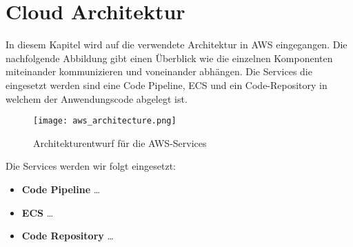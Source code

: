 \section{Cloud Architektur}
In diesem Kapitel wird auf die verwendete Architektur in \ac{AWS} eingegangen. Die nachfolgende Abbildung gibt einen Überblick wie die einzelnen Komponenten miteinander kommunizieren und voneinander abhängen. Die Services die eingesetzt werden sind eine Code Pipeline, ECS und ein Code-Repository in welchem der Anwendungscode abgelegt ist.

\begin{figure}[H]
    \centering
    \texttt{[image: aws\_architecture.png]}
    \caption{Architekturentwurf für die AWS-Services}
    \label{fig:CloudArchitektur}
\end{figure}

Die Services werden wir folgt eingesetzt:
\begin{itemize}
    \item \textbf{Code Pipeline} \dots
    \item \textbf{ECS} \dots
    \item \textbf{Code Repository} \dots
\end{itemize}